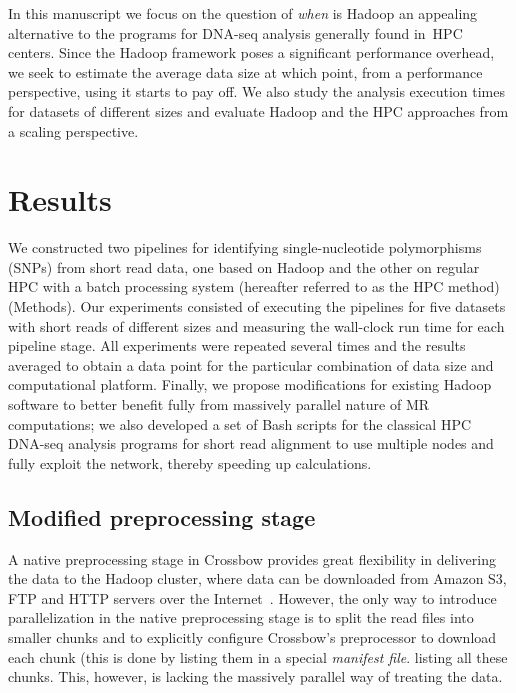 \documentclass[10pt]{article}
\begin{document}
In this manuscript we focus on the question of {\it when} is Hadoop an appealing alternative to the programs for DNA-seq analysis generally found in~HPC centers.
Since the Hadoop framework poses a significant performance overhead, we seek to estimate the average data size at which point, from a performance perspective, using it starts to pay off. We also study the analysis execution times for datasets of different sizes and evaluate Hadoop and the HPC approaches from a scaling perspective.


\section*{Results}

We constructed two pipelines for identifying single-nucleotide polymorphisms (SNPs) from short read data, one based on Hadoop and the other on regular HPC with a batch processing system (hereafter referred to as the HPC method) (Methods).
Our experiments consisted of executing the pipelines for five datasets with short reads of different sizes and measuring the wall-clock run time for each pipeline stage.
All experiments were repeated several times and the results averaged to obtain a data point for the particular combination of data size and computational platform.
Finally, we propose modifications for existing Hadoop software to better benefit fully from massively parallel nature of MR computations; we also
developed a set of Bash scripts for the classical HPC DNA-seq analysis programs for short read alignment to use multiple nodes and fully exploit the network, thereby speeding up calculations.



\subsection*{Modified preprocessing stage}
A native preprocessing stage in Crossbow provides great flexibility in delivering the data to the Hadoop cluster, where data can be downloaded from Amazon S3, FTP and HTTP servers over the Internet~\cite{Langmead:2009kx}. However, the only way to introduce parallelization in the native preprocessing stage is to split the read files into smaller chunks and to explicitly configure Crossbow's preprocessor to download each chunk (this is done by listing them in a special \textit{manifest file}. listing all these chunks. This, however, is lacking the massively parallel way of treating the data.
\end{document}
